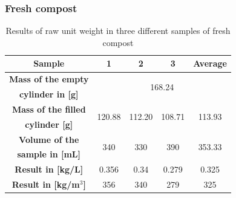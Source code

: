 \documentclass{article}
\begin{document}
\subsubsection{Fresh compost}
\renewcommand{\arraystretch}{1.5}
\begin{table}[ht!]
    \centering \vspace{.3cm}
    \caption{Results of raw unit weight in three different samples of fresh compost}
    \begin{tabular}{|c|c|c|c|c|}
        \hline
        \textbf{Sample} & \textbf{1} & \textbf{2} & \textbf{3} & \textbf{Average}\\
        \hline
        {\textbf{Mass of the empty}} & \multicolumn{4}{c|}{\multirow{2}{*}{168.24}}\\
        \textbf{cylinder in [g]} & \multicolumn{4}{c|}{}\\
        \hline
        \textbf{Mass of the filled} & \multirow{2}{*}{120.88} & \multirow{2}{*}{112.20} & \multirow{2}{*}{108.71} & \multirow{2}{*}{113.93}\\
        \textbf{cylinder [g]} & & & &\\
        \hline
        \textbf{Volume of the} & \multirow{2}{*}{340} & \multirow{2}{*}{330} & \multirow{2}{*}{390} & \multirow{2}{*}{353.33}\\
        \textbf{sample in [mL]} & & & &\\
        \hline
        \textbf{Result in [kg/L]} & 0.356 & 0.34 & 0.279 & 0.325\\
        \hline
        \textbf{Result in [kg/m$^3$]} & 356 & 340 & 279 & 325\\
        \hline
    \end{tabular}
\end{table}
\end{document}
